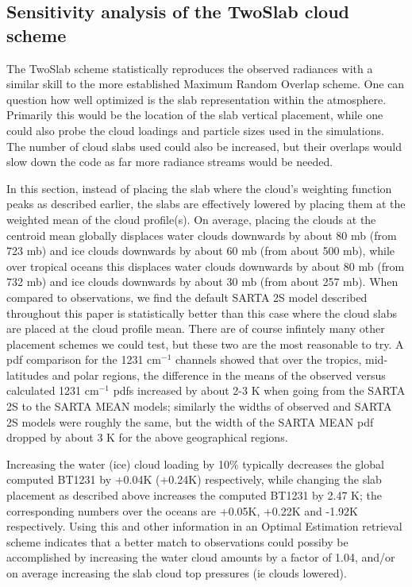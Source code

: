 \documentclass[agupp]{aguplus}              %
\newcommand{\wn}{cm$^{-1}$\xspace}
\begin{document}
\begin{article}
\section{Sensitivity analysis of the TwoSlab cloud scheme}

The TwoSlab scheme statistically reproduces the observed radiances
with a similar skill to the more established Maximum Random Overlap
scheme. One can question how well optimized is the slab representation
within the atmosphere. Primarily this would be the location of the
slab vertical placement, while one could also probe the cloud loadings
and particle sizes used in the simulations. The number of cloud slabs
used could also be increased, but their overlaps would slow down the
code as far more radiance streams would be needed.

In this section, instead of placing the slab where the cloud's
weighting function peaks as described earlier, the slabs are
effectively lowered by placing them at the weighted mean of the cloud
profile(s). On average, placing the clouds at the centroid mean
globally displaces water clouds downwards by about 80 mb (from 723 mb)
and ice clouds downwards by about 60 mb (from about 500 mb), while
over tropical oceans this displaces water clouds downwards by about 80
mb (from 732 mb) and ice clouds downwards by about 30 mb (from about
257 mb). When compared to observations, we find the default SARTA 2S
model described throughout this paper is statistically better than
this case where the cloud slabs are placed at the cloud profile
mean. There are of course infintely many other placement schemes we
could test, but these two are the most reasonable to try. A pdf
comparison for the 1231 \wn channels showed that over the tropics,
mid-latitudes and polar regions, the difference in the means of the
observed versus calculated 1231 \wn pdfs increased by about 2-3 K when
going from the SARTA 2S to the SARTA MEAN models; similarly the widths
of observed and SARTA 2S models were roughly the same, but the width
of the SARTA MEAN pdf dropped by about 3 K for the above geographical
regions.

Increasing the water (ice) cloud loading by 10\% typically decreases
the global computed BT1231 by +0.04K (+0.24K) respectively, while
changing the slab placement as described above increases the computed
BT1231 by 2.47 K; the corresponding numbers over the oceans are
+0.05K, +0.22K and -1.92K respectively. Using this and other
information in an Optimal Estimation retrieval scheme \citep{rod:00}
indicates that a better match to observations could possiby be
accomplished by increasing the water cloud amounts by a factor of
1.04, and/or on average increasing the slab cloud top pressures (ie
clouds lowered).


\end{article}
\end{document}

